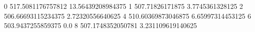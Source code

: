 0 517.5081176757812 13.56439208984375
1 507.71826171875 3.7745361328125
2 506.66693115234375 2.72320556640625
4 510.60369873046875 6.65997314453125
6 503.9437255859375 0.0
8 507.1748352050781 3.231109619140625
